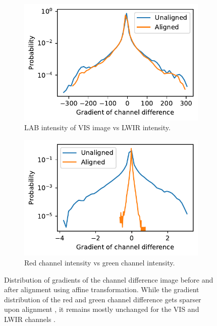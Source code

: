 \documentclass{l4proj}
\begin{document}
\begin{figure}[ht]
  \centering
  \begin{subfigure}[h!]{0.45\textwidth}
    \includegraphics[width=\textwidth]{images/registration/gradient_distribution}
    \caption{LAB intensity of VIS image vs LWIR intensity.}
    \label{fig:gradient_distribution}
  \end{subfigure}
  \begin{subfigure}[h!]{0.45\textwidth}
    \includegraphics[width=\textwidth]{images/registration/gradient_distribution_red_green}
    \caption{Red channel intensity vs green channel intensity.}
    \label{fig:gradient_distribution_red_green}
  \end{subfigure}
  \caption{Distribution of gradients of the channel difference image before and after alignment using affine transformation. While the gradient distribution of the red and green channel difference gets sparser upon alignment , it remains mostly unchanged for the VIS and LWIR channels .}
\end{figure}
\end{document}
